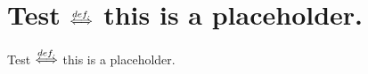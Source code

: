 
\section{Test \texorpdfstring{$\stackrel{def.}{\Longleftrightarrow}$}{<=def=>} this is a placeholder.}
Test $\stackrel{def.}{\Longleftrightarrow}$ this is a placeholder.
